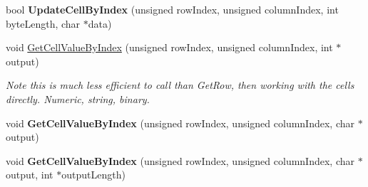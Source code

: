 \begin{DoxyCompactItemize}
\item 
\hypertarget{class_data_structures_1_1_table_a39175d06f817e24c218a60bbb7899211}{bool {\bfseries Update\-Cell\-By\-Index} (unsigned row\-Index, unsigned column\-Index, int byte\-Length, char $\ast$data)}\label{class_data_structures_1_1_table_a39175d06f817e24c218a60bbb7899211}

\item 
\hypertarget{class_data_structures_1_1_table_a8700ceea2b9d81d3a4a3ef8e2034b762}{void \hyperlink{class_data_structures_1_1_table_a8700ceea2b9d81d3a4a3ef8e2034b762}{Get\-Cell\-Value\-By\-Index} (unsigned row\-Index, unsigned column\-Index, int $\ast$output)}\label{class_data_structures_1_1_table_a8700ceea2b9d81d3a4a3ef8e2034b762}

\begin{DoxyCompactList}\small\item\em Note this is much less efficient to call than Get\-Row, then working with the cells directly. Numeric, string, binary. \end{DoxyCompactList}\item 
\hypertarget{class_data_structures_1_1_table_a9293f4f40ba7cc166882d3e839df84aa}{void {\bfseries Get\-Cell\-Value\-By\-Index} (unsigned row\-Index, unsigned column\-Index, char $\ast$output)}\label{class_data_structures_1_1_table_a9293f4f40ba7cc166882d3e839df84aa}

\item 
\hypertarget{class_data_structures_1_1_table_a98754936d98b2e5fc90ad4ad34167b5e}{void {\bfseries Get\-Cell\-Value\-By\-Index} (unsigned row\-Index, unsigned column\-Index, char $\ast$output, int $\ast$output\-Length)}\label{class_data_structures_1_1_table_a98754936d98b2e5fc90ad4ad34167b5e}


\end{DoxyCompactItemize}

